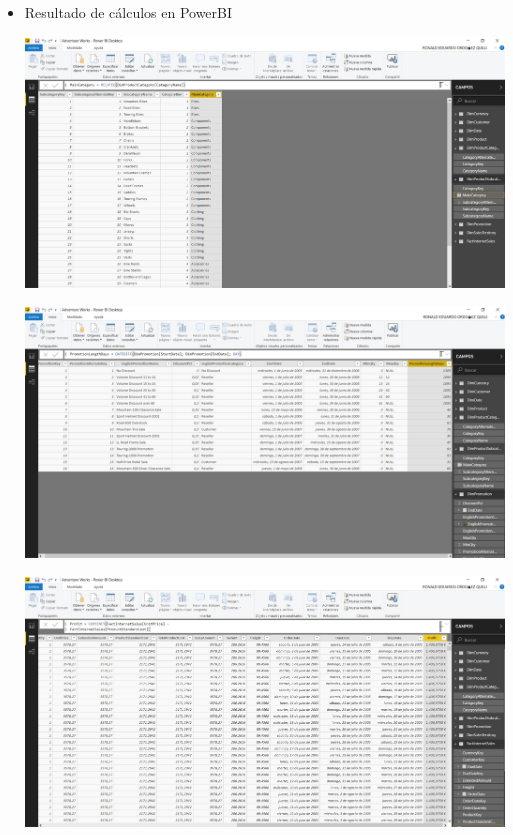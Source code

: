 \begin{itemize}
	\item Resultado de cálculos en PowerBI
	\begin{center}
	\includegraphics[width=16cm]{./Imagenes/imgpbi3} 
	\end{center}
	\begin{center}
	\includegraphics[width=16cm]{./Imagenes/imgpbi4} 
	\end{center}
	\begin{center}
	\includegraphics[width=16cm]{./Imagenes/imgpbi5} 
	\end{center}

\end{itemize}
